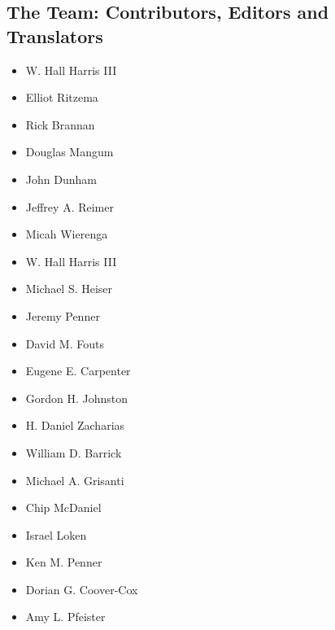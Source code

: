 \clearpage

\subsection*{The Team: Contributors, Editors and Translators}

\begin{multicols}{3}
\begin{headings}
\vspace{-\topsep}
\begin{itemize}[rightmargin=0.125in, leftmargin=0.125in]
\fontsize{9.5pt}{11pt}\selectfont
\setlength{\parskip}{0pt} \setlength{\itemsep}{0pt plus 1pt}
\setlength{\columnsep}{0}
    \item W. Hall Harris III
    \item Elliot Ritzema
    \item Rick Brannan
    \item Douglas Mangum
    \item John Dunham
    \item Jeffrey A. Reimer
    \item Micah Wierenga
    \item W. Hall Harris III
    \item Michael S. Heiser
    \item Jeremy Penner
    \item David M. Fouts
    \item Eugene E. Carpenter
    \item Gordon H. Johnston
    \item H. Daniel Zacharias
    \item William D. Barrick
    \item Michael A. Grisanti
    \item Chip McDaniel
    \item Israel Loken
    \item Ken M. Penner
    \item Dorian G. Coover-Cox
    \item Amy L. Pfeister
    \vfill
\end{itemize}

\vspace{-\topsep}
\end{headings}
\end{multicols}

